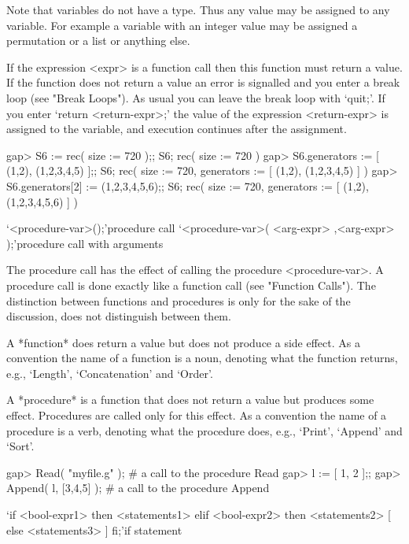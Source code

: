 Note that variables do not have a type. Thus any value may be assigned
to any variable.  For example a variable with an integer value may be
assigned a permutation or a list or anything else.

If the expression <expr> is a function call then this function must
return a value.  If the function does not return a value an error is
signalled and you enter a break loop (see "Break Loops").  As usual you
can leave the break  loop  with `quit;'.  If you enter  `return
<return-expr>;' the value of the expression <return-expr> is assigned to
the variable, and execution continues after the assignment.

\beginexample
gap> S6 := rec( size := 720 );; S6;
rec(
 size := 720 )
gap> S6.generators := [ (1,2), (1,2,3,4,5) ];; S6;
rec(
 size := 720,
 generators := [ (1,2), (1,2,3,4,5) ] )
gap> S6.generators[2] := (1,2,3,4,5,6);; S6;
rec(
 size := 720,
 generators := [ (1,2), (1,2,3,4,5,6) ] )
\endexample


\>`<procedure-var>();'{procedure call}
\>`<procedure-var>( <arg-expr> {,<arg-expr>} );'{procedure call with arguments}

The  procedure call  has  the  effect  of calling  the procedure
<procedure-var>.  A procedure call is done exactly like a function call
(see "Function Calls"). The distinction between functions and procedures
is only for the sake of the discussion, {\GAP} does not distinguish
between them.

A *function* does return a value but does not produce a side effect. As
a convention the name of a function is a noun, denoting what the function
returns, e.g., `Length', `Concatenation' and `Order'.

A *procedure* is a function that does not return a value but produces
some  effect. Procedures are called  only for  this effect. As  a
convention the name of a procedure is a verb, denoting what the procedure
does, e.g., `Print', `Append' and `Sort'.

\begintt
gap> Read( "myfile.g" );   # a call to the procedure Read
gap> l := [ 1, 2 ];;
gap> Append( l, [3,4,5] );  # a call to the procedure Append
\endtt



\>`if <bool-expr1> then <statements1> { elif <bool-expr2> then <statements2> }[ else <statements3> ] fi;'{if statement}


